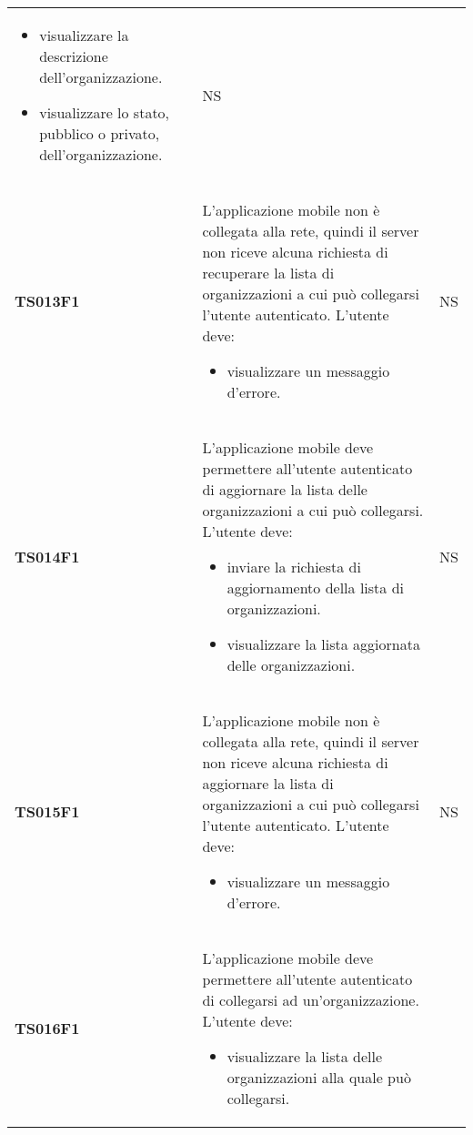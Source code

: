 \documentclass[../piano-di-qualifica.tex]{subfiles}
\begin{document}
\begin{centering}
\begin{longtable}[H]{>{\centering\bfseries}m{3cm} >{}p{10cm} >{\centering\arraybackslash}m{3cm}}
\begin{itemize}
                      \item visualizzare la descrizione dell'organizzazione.
                      \item visualizzare lo stato, pubblico o privato, dell'organizzazione.
                    \end{itemize}
                  & NS \\
        TS013F1    & L'applicazione mobile non è collegata alla rete, quindi il server non riceve alcuna richiesta di recuperare la lista di organizzazioni a cui può collegarsi l'utente autenticato. \newline
                    L'utente deve:
                    \begin{itemize}
                      \item visualizzare un messaggio d'errore.
                    \end{itemize}
                & NS \\
        TS014F1    & L'applicazione mobile deve permettere all'utente autenticato di aggiornare la lista delle organizzazioni a cui può collegarsi. \newline
                    L'utente deve:
                    \begin{itemize}
                      \item inviare la richiesta di aggiornamento della lista di organizzazioni.
                      \item visualizzare la lista aggiornata delle organizzazioni.
                    \end{itemize}
                & NS \\
        TS015F1    & L'applicazione mobile non è collegata alla rete, quindi il server non riceve alcuna richiesta di aggiornare la lista di organizzazioni a cui può collegarsi l'utente autenticato. \newline
                    L'utente deve:
                    \begin{itemize}
                      \item visualizzare un messaggio d'errore.
                    \end{itemize}
                & NS \\
        TS016F1    & L'applicazione mobile deve permettere all'utente autenticato di collegarsi ad un'organizzazione. \newline
                    L'utente deve:
                      \begin{itemize}
                        \item visualizzare la lista delle organizzazioni alla quale può collegarsi.

\end{itemize}
\end{longtable}
\end{centering}
\end{document}
